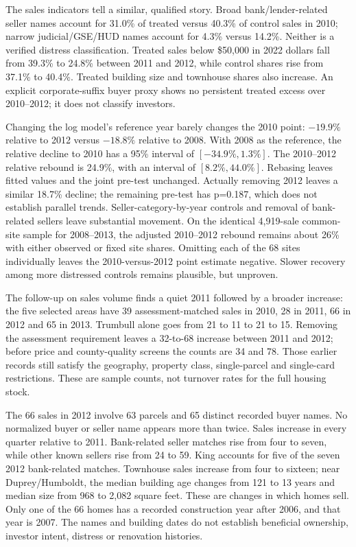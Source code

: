 The sales indicators tell a similar, qualified story. Broad bank/lender-related
seller names account for 31.0\% of treated versus 40.3\% of control sales
in 2010; narrow judicial/GSE/HUD names account for 4.3\% versus 14.2\%.
Neither is a verified distress classification. Treated sales below \$50,000
in 2022 dollars fall from 39.3\% to 24.8\% between 2011 and 2012, while
control shares rise from 37.1\% to 40.4\%. Treated building size and townhouse
shares also increase. An explicit corporate-suffix buyer proxy shows no
persistent treated excess over 2010--2012; it does not classify investors.

Changing the log model's reference year barely changes the 2010 point:
$-19.9\%$ relative to 2012 versus $-18.8\%$ relative to 2008. With 2008 as the
reference, the relative decline to 2010 has a 95\% interval of
$[-34.9\%,1.3\%]$. The 2010--2012 relative rebound is 24.9\%, with an
interval of $[8.2\%,44.0\%]$. Rebasing leaves fitted values and the joint
pre-test unchanged. Actually removing 2012 leaves a similar 18.7\% decline;
the remaining pre-test has p=0.187, which does not establish parallel trends.
Seller-category-by-year controls and removal of bank-related sellers leave
substantial movement. On the identical 4,919-sale common-site sample for
2008--2013, the adjusted 2010--2012 rebound remains about 26\% with either
observed or fixed site shares. Omitting each of the 68 sites individually
leaves the 2010-versus-2012 point estimate negative. Slower recovery among
more distressed controls remains plausible, but unproven.

The follow-up on sales volume finds a quiet 2011 followed by a broader
increase: the five selected areas have 39 assessment-matched sales in 2010,
28 in 2011, 66 in 2012 and 65 in 2013. Trumbull alone goes from 21 to 11
to 21 to 15. Removing the assessment requirement leaves a 32-to-68 increase
between 2011 and 2012; before price and county-quality screens the counts
are 34 and 78. Those earlier records still satisfy the geography, property
class, single-parcel and single-card restrictions. These are sample counts,
not turnover rates for the full housing stock.

The 66 sales in 2012 involve 63 parcels and 65 distinct recorded buyer names.
No normalized buyer or seller name appears more than twice. Sales increase
in every quarter relative to 2011. Bank-related seller matches rise from
four to seven, while other known sellers rise from 24 to 59. King accounts
for five of the seven 2012 bank-related matches. Townhouse sales increase
from four to sixteen; near Duprey/Humboldt, the median building age changes
from 121 to 13 years and median size from 968 to 2,082 square feet. These
are changes in which homes sell. Only one of the 66 homes has a recorded
construction year after 2006, and that year is 2007. The names and building
dates do not establish beneficial ownership, investor intent, distress or
renovation histories.

